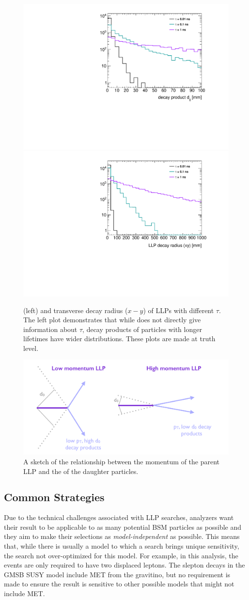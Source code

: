 \begin{figure}[!h]
\centering
\includegraphics[width=.48\textwidth]{figures/theory/signal_d0.pdf}
\includegraphics[width=.48\textwidth]{figures/theory/signal_rxy.pdf}
\caption{\dzero (left) and transverse decay radius ($x-y$) of \ac{LLP}s with different $\tau$. The left plot demonstrates that while \dzero does not directly give information about $\tau$, decay products of particles with longer lifetimes have wider \dzero distributions. These plots are made at truth level.}
\label{fig:d0-rltns}
\end{figure}

\begin{figure}[!h]
\centering
\includegraphics[width=.6\textwidth]{figures/theory/pt-d0.png}
\caption{A sketch of the relationship between the momentum of the parent \ac{LLP} and the \dz of the daughter particles.}
\label{fig:d0-pt}
\end{figure}

\subsection{Common Strategies}

Due to the technical challenges associated with \ac{LLP} searches, analyzers want their result to be applicable to as many potential \ac{BSM} particles as possible and they aim to make their selections as \emph{model-independent} as possible. This means that, while there is usually a model to which a search brings unique sensitivity, the search not over-optimized for this model. For example, in this analysis, the events are only required to have two displaced leptons. The slepton decays in the \ac{GMSB} \ac{SUSY} model include \ac{MET} from the gravitino, but no requirement is made to ensure the result is sensitive to other possible models that might not include \ac{MET}.



